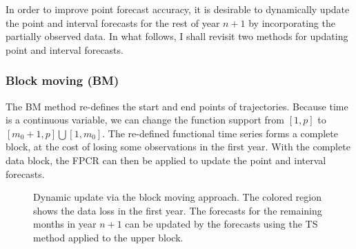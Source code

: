 \documentclass[nojss]{jss}
\begin{document}
In order to improve point forecast accuracy, it is desirable to dynamically update the point and interval forecasts for the rest of year $n+1$ by incorporating the partially observed data. In what follows, I shall revisit two methods for updating point and interval forecasts.

\subsubsection*{Block moving (BM)}

The BM method re-defines the start and end points of trajectories. Because time is a continuous variable, we can change the function support from $[1,p]$ to $[m_0+1, p]\bigcup [1,m_0]$. The re-defined functional time series forms a complete block, at the cost of losing some observations in the first year. With the complete data block, the FPCR can then be applied to update the point and interval forecasts.

\begin{figure}[!ht]
\begin{center}
\end{center}
\caption{\small{Dynamic update via the block moving approach. The colored region shows the data loss in the first year. The forecasts for the remaining months in year $n+1$ can be updated by the forecasts using the TS method applied to the upper block.}}\label{fig:11}
\end{figure}
\end{document}
